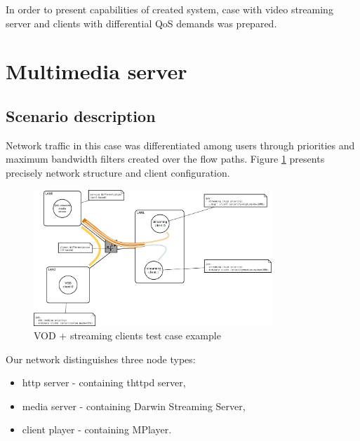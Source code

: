 \documentclass[11pt]{book}
\begin{document}
    In order to present capabilities of created system, case with video streaming server and clients with differential
    QoS demands was prepared.


    \section{Multimedia server}

      \subsection{Scenario description}

        Network traffic in this case was differentiated among users through priorities and maximum bandwidth filters
        created over the flow paths. Figure \ref{fig:cs:scenario} presents precisely network structure and client
        configuration.
      
        \begin{figure}[H]
          \begin{center}
            \includegraphics[width=0.8\textwidth]{img/test-case/diagram.pdf}
          \end{center}

          \caption{VOD + streaming clients test case example}
          \label{fig:cs:scenario}
        \end{figure}
        
        Our network distinguishes three node types:
        \begin{itemize}
          \item{http server - containing thttpd server,}
          \item{media server - containing Darwin Streaming Server,}
          \item{client player - containing MPlayer.}
        \end{itemize}
        
\end{document}
